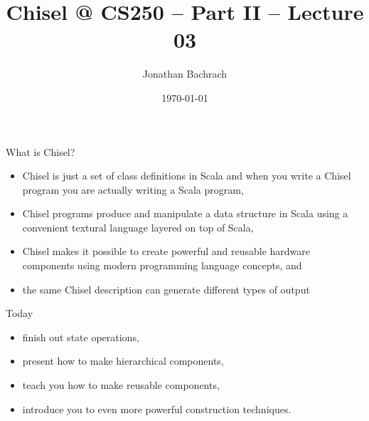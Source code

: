 \documentclass[xcolor=pdflatex,dvipsnames,table]{beamer}
\title{Chisel @ CS250 -- Part II -- Lecture 03}
\author{Jonathan Bachrach}
\date{\today}
\institute[UC Berkeley]{EECS UC Berkeley}
\begin{document}
\begin{frame}
\titlepage
\end{frame}
\addtocounter{framenumber}{-1}

% 
% 
% 

\begin{frame}[fragile]{What is Chisel?}
\begin{itemize}
\item Chisel is just a set of class definitions in Scala and
 when you write a Chisel program you are actually writing a Scala program,
\item Chisel programs produce and manipulate a data structure in Scala using a convenient textural language layered on top of Scala,
\item Chisel makes it possible to create powerful and reusable hardware components using modern programming language concepts, and
\item the same Chisel description can generate different types of output
\end{itemize}
\end{frame}

\begin{frame}[fragile]{Today}
\begin{itemize}
\item finish out state operations,
\item present how to make hierarchical components, 
\item teach you how to make reusable components,
\item introduce you to even more powerful construction techniques.
\end{itemize}
\end{frame}
\end{document}
